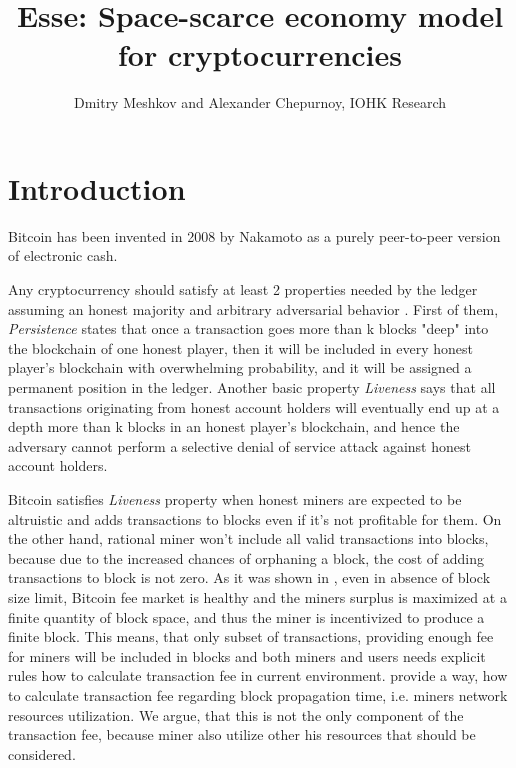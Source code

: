 \documentclass[]{article}   %
\newcommand{\authnote}[2]{\marginpar{\parbox{\marginparwidth}{\tiny %
  \textsf{#1 {\textcolor{blue}{notes: #2}}}}}%
  \textcolor{blue}{\textbf{\dag}}}
\newcommand{\authnote}[2]{
  \textsf{#1 \textcolor{blue}{: #2}}}
\newcommand{\authnote}[2]{}
\newcommand{\dnote}[1]{{\authnote{\textcolor{blue}{Dima notes}}{#1}}}
\newcommand{\esse}{Esse}
\begin{document}
\title{\esse{}: Space-scarce economy model for cryptocurrencies}
\author{Dmitry Meshkov and Alexander Chepurnoy, IOHK Research}
\maketitle

\section{Introduction}

Bitcoin \cite{Nakamoto2008} has been invented in 2008 by Nakamoto as a purely peer-to-peer version of electronic cash. \dnote{more words about bitcoin as an economy}

Any cryptocurrency should satisfy at least 2 properties needed by the ledger assuming an honest majority and arbitrary adversarial behavior \cite{Garay2015}. First of them, \textit{Persistence} states that once a transaction goes more than k blocks "deep" into the blockchain of one honest player, then it will be included in every honest player's blockchain with overwhelming probability, and it will be assigned a permanent position in the ledger. Another basic property \textit{Liveness} says that all transactions originating from honest account holders will eventually end up at a depth more than k blocks in an honest player's blockchain, and hence the adversary cannot perform a selective denial of service attack against honest account holders.

Bitcoin satisfies \textit{Liveness} property when honest miners are expected to be altruistic and adds transactions to blocks even if it's not profitable for them. On the other hand, rational miner won't include all valid transactions into blocks, because due to the increased chances of orphaning a block, the cost of adding transactions to block is not zero\cite{rizun2015transaction, andresen2013}. As it was shown in \cite{rizun2015transaction}, even in absence of block size limit, Bitcoin fee market is healthy and the miners surplus is maximized at a finite quantity of block space, and thus the miner is incentivized to produce a finite block. This means, that only subset of transactions, providing enough fee for miners will be included in blocks and both miners and users needs explicit rules how to calculate transaction fee in current environment. \cite{rizun2015transaction} provide a way, how to calculate transaction fee regarding block propagation time, i.e. miners network resources utilization. We argue, that this is not the only component of the transaction fee, because miner also utilize other his resources that should be considered.
\end{document}
